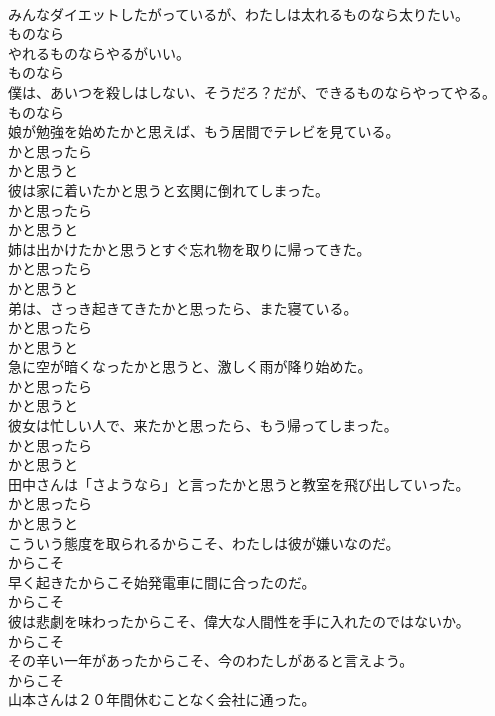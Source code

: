 \documentclass[8pt]{extreport}
\begin{document}
\begin{CJK}{UTF8}{min}
\\	みんなダイエットしたがっているが、わたしは太れるものなら太りたい。	
\\	ものなら
\\	やれるものならやるがいい。	
\\	ものなら
\\	僕は、あいつを殺しはしない、そうだろ？だが、できるものならやってやる。	
\\	ものなら
\\	娘が勉強を始めたかと思えば、もう居間でテレビを見ている。	
\\	かと思ったら 
\\	かと思うと
\\	彼は家に着いたかと思うと玄関に倒れてしまった。	
\\	かと思ったら 
\\	かと思うと
\\	姉は出かけたかと思うとすぐ忘れ物を取りに帰ってきた。	
\\	かと思ったら 
\\	かと思うと
\\	弟は、さっき起きてきたかと思ったら、また寝ている。	
\\	かと思ったら 
\\	かと思うと
\\	急に空が暗くなったかと思うと、激しく雨が降り始めた。	
\\	かと思ったら 
\\	かと思うと
\\	彼女は忙しい人で、来たかと思ったら、もう帰ってしまった。	
\\	かと思ったら 
\\	かと思うと
\\	田中さんは「さようなら」と言ったかと思うと教室を飛び出していった。	
\\	かと思ったら 
\\	かと思うと
\\	こういう態度を取られるからこそ、わたしは彼が嫌いなのだ。	
\\	からこそ
\\	早く起きたからこそ始発電車に間に合ったのだ。	
\\	からこそ
\\	彼は悲劇を味わったからこそ、偉大な人間性を手に入れたのではないか。	
\\	からこそ
\\	その辛い一年があったからこそ、今のわたしがあると言えよう。	
\\	からこそ
\\	山本さんは２０年間休むことなく会社に通った。	

\end{CJK}
\end{document}
